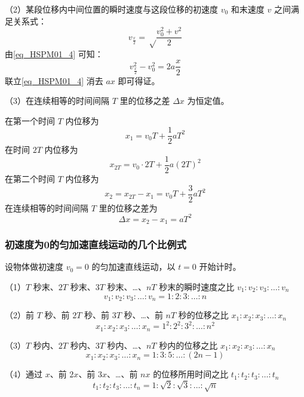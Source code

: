 （2）某段位移内中间位置的瞬时速度与这段位移的初速度 $v_0$ 和末速度 $v$ 之间满足关系式：
\begin{equation}
v_\frac x2=\sqrt \frac{v_0^2+v^2}2
\end{equation}
由\autoref{eq_HSPM01_4} 可知：
\begin{equation}
v_{\frac x2}^2-v_0^2=2a\frac x2
\end{equation}
联立\autoref{eq_HSPM01_4} 消去 $ax$ 即可得证。

（3）在连续相等的时间间隔 $T$ 里的位移之差 $\Delta x$ 为恒定值。

在第一个时间 $T$ 内位移为
\begin{equation}
x_1=v_0T+\frac12aT^2
\end{equation}
在时间 $2T$ 内位移为
\begin{equation}
x_{2T}=v_0\cdot2T+\frac12a(2T)^2
\end{equation}
在第二个时间 $T$ 内位移为
\begin{equation}
x_2=x_{2T}-x_1=v_0T+\frac32aT^2
\end{equation}
在连续相等的时间间隔 $T$ 里的位移之差为
\begin{equation}
\Delta x=x_2-x_1=aT^2
\end{equation}

\subsubsection{初速度为0的匀加速直线运动的几个比例式}
设物体做初速度 $v_0=0$ 的匀加速直线运动，以 $t=0$ 开始计时。

（1）$T$ 秒末、$2T$ 秒末、$3T$ 秒末、…、$nT$ 秒末的瞬时速度之比 $v_1:v_2:v_3:\dots:v_n$
\begin{equation}
v_1:v_2:v_3:\dots:v_n=1:2:3:\dots:n
\end{equation}

（2）前 $T$ 秒、前 $2T$ 秒、前 $3T$ 秒、…、前 $nT$ 秒的位移之比 $x_1:x_2:x_3:\dots:x_n$
\begin{equation}
x_1:x_2:x_3:\dots:x_n=1^2:2^2:3^2:\dots:n^2
\end{equation}

（3）$T$ 秒内、$2T$ 秒内、$3T$ 秒内、…、$nT$ 秒内的位移之比 $x_1:x_2:x_3:\dots:x_n$
\begin{equation}
x_1:x_2:x_3:\dots:x_n=1:3:5:\dots:(2n-1)
\end{equation}

（4）通过 $x$、前 $2x$、前 $3x$、…、前 $nx$ 的位移所用时间之比 $t_1:t_2:t_3:\dots:t_n$
\begin{equation}
t_1:t_2:t_3:\dots:t_n=1:\sqrt{2}:\sqrt{3}:\dots:\sqrt{n}
\end{equation}

